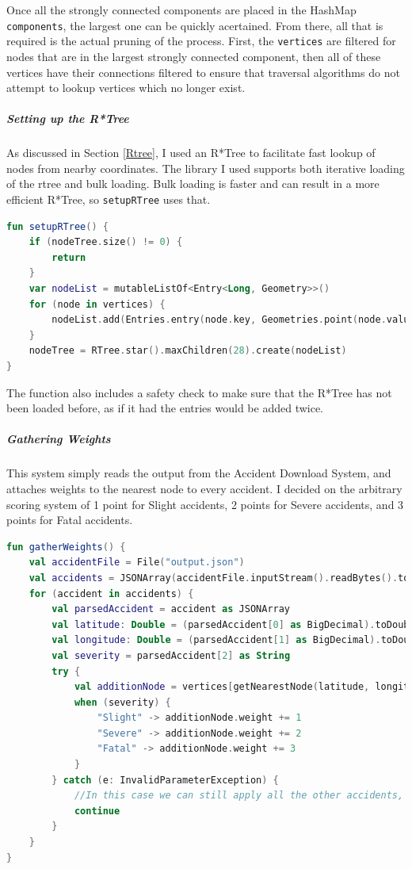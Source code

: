 \documentclass[11pt,twoside,a4paper]{article}
\begin{document}
Once all the strongly connected components are placed in the HashMap \texttt{components}, the largest one can be quickly acertained. From there, all that is required is the actual pruning of the process.
First, the \texttt{vertices} are filtered for nodes that are in the largest strongly connected component, then all of these vertices have their connections filtered to ensure that traversal algorithms do not attempt to lookup vertices which no longer exist.
\subparagraph{Setting up the R*Tree}
As discussed in Section \ref{Rtree}, I used an R*Tree to facilitate fast lookup of nodes from nearby coordinates. The library I used\cite{rtree} supports both iterative loading of the rtree and bulk loading. Bulk loading is faster and can result in a 
more efficient R*Tree, so \texttt{setupRTree} uses that. 
\begin{lstlisting}[language=kotlin]
fun setupRTree() {
    if (nodeTree.size() != 0) {
        return
    }
    var nodeList = mutableListOf<Entry<Long, Geometry>>()
    for (node in vertices) {
        nodeList.add(Entries.entry(node.key, Geometries.point(node.value.longitude, node.value.latitude)))
    }
    nodeTree = RTree.star().maxChildren(28).create(nodeList)
}
\end{lstlisting}
The function also includes a safety check to make sure that the R*Tree has not been loaded before, as if it had the entries would be added twice. 
\newpage
\subparagraph{Gathering Weights}
This system simply reads the output from the Accident Download System, and attaches weights to the nearest node to every accident. I decided on the arbitrary scoring system of 1 point for Slight accidents, 2 points for Severe accidents, and 3 points for Fatal accidents. 
\begin{lstlisting}[language=kotlin]
fun gatherWeights() {
    val accidentFile = File("output.json")
    val accidents = JSONArray(accidentFile.inputStream().readBytes().toString(Charsets.UTF_8))
    for (accident in accidents) {
        val parsedAccident = accident as JSONArray
        val latitude: Double = (parsedAccident[0] as BigDecimal).toDouble()
        val longitude: Double = (parsedAccident[1] as BigDecimal).toDouble()
        val severity = parsedAccident[2] as String
        try {
            val additionNode = vertices[getNearestNode(latitude, longitude)]!!
            when (severity) {
                "Slight" -> additionNode.weight += 1
                "Severe" -> additionNode.weight += 2
                "Fatal" -> additionNode.weight += 3
            }
        } catch (e: InvalidParameterException) {
            //In this case we can still apply all the other accidents, even if this accident doesn't match well.
            continue
        }
    }
}
\end{lstlisting}
\end{document}
